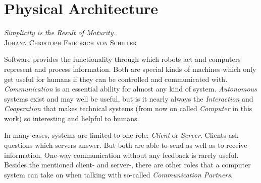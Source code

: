 %
%
%
%
%
%
%

\chapter{Physical Architecture}
\label{physical_architecture_heading}

\begin{flushright}
    \textsl{Simplicity is the Result of Maturity.}\\
    \textsc{Johann Christoph Friedrich von Schiller}
\end{flushright}

Software provides the functionality through which robots act and computers
represent and process information. Both are special kinds of machines which only
get useful for humans if they can be controlled and communicated with.
\emph{Communication} is an essential ability for almost any kind of system.
\emph{Autonomous} systems exist and may well be useful, but is it nearly always
the \emph{Interaction} and \emph{Cooperation} that makes technical systems (from
now on called \emph{Computer} in this work) so interesting and helpful to humans.

In many cases, systems are limited to one role: \emph{Client} or \emph{Server}.
Clients ask questions which servers answer. But both are able to send as well
as to receive information. One-way communication without any feedback is rarely
useful. Besides the mentioned client- and server-, there are other roles that a
computer system can take on when talking with so-called
\emph{Communication Partners}.

